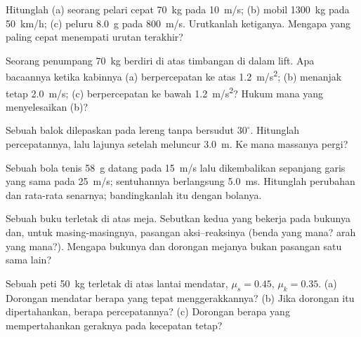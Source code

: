 \begin{exercise}[$\star$]\label{exo:g12:newtons-laws:1}
Hitunglah  (a) seorang pelari cepat \qty{70}{kg} pada \qty{10}{m/s}; (b) mobil
\qty{1300}{kg} pada \qty{50}{km/h}; (c) peluru \qty{8.0}{g} pada \qty{800}{m/s}.
Urutkanlah ketiganya. Mengapa yang paling cepat menempati urutan terakhir?
\end{exercise}

\begin{exercise}[$\star$]\label{exo:g12:newtons-laws:2}
Seorang penumpang \qty{70}{kg} berdiri di atas timbangan di dalam lift. Apa bacaannya
ketika kabinnya (a) berpercepatan ke atas \qty{1.2}{m/s^2}; (b) menanjak tetap
\qty{2.0}{m/s}; (c) berpercepatan ke bawah \qty{1.2}{m/s^2}? Hukum mana yang
menyelesaikan (b)?
\end{exercise}

\begin{exercise}[$\star$]\label{exo:g12:newtons-laws:3}
Sebuah balok dilepaskan pada lereng tanpa  bersudut $30^\circ$. Hitunglah
percepatannya, lalu lajunya setelah meluncur \qty{3.0}{m}. Ke mana massanya pergi?
\end{exercise}

\begin{exercise}[$\star$]\label{exo:g12:newtons-laws:4}
Sebuah bola tenis \qty{58}{g} datang pada \qty{15}{m/s} lalu dikembalikan sepanjang
garis yang sama pada \qty{25}{m/s}; sentuhannya berlangsung \qty{5.0}{ms}. Hitunglah
perubahan  dan  rata-rata senarnya; bandingkanlah  itu dengan 
bolanya.
\end{exercise}

\begin{exercise}[$\star$]\label{exo:g12:newtons-laws:5}
Sebuah buku terletak di atas meja. Sebutkan kedua  yang bekerja pada bukunya dan,
untuk masing-masingnya, pasangan aksi--reaksinya (benda yang mana? arah yang mana?).
Mengapa  bukunya dan dorongan mejanya bukan pasangan satu sama lain?
\end{exercise}

\begin{exercise}[$\star\star$]\label{exo:g12:newtons-laws:6}
Sebuah peti \qty{50}{kg} terletak di atas lantai mendatar, $\mu_s = 0.45$,
$\mu_k = 0.35$. (a) Dorongan mendatar berapa yang tepat menggerakkannya? (b) Jika
dorongan itu dipertahankan, berapa percepatannya? (c) Dorongan berapa yang
mempertahankan geraknya pada kecepatan tetap?
\end{exercise}

